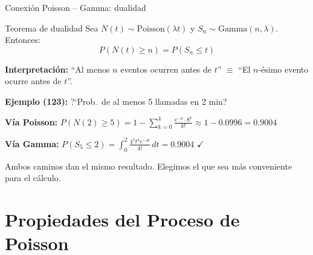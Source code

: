 \documentclass[aspectratio=1610, 9pt]{beamer}
\begin{document}
\begin{frame}{Conexi\'{o}n Poisson -- Gamma: dualidad}

\begin{block}{Teorema de dualidad}
Sea $N(t) \sim \text{Poisson}(\lambda t)$ y $S_n \sim \text{Gamma}(n,\lambda)$. Entonces:
\[
P(N(t) \geq n) = P(S_n \leq t)
\]
\end{block}

\textbf{Interpretaci\'{o}n:} ``Al menos $n$ eventos ocurren antes de $t$'' $\equiv$ ``El $n$-\'{e}simo evento ocurre antes de $t$''.

\vspace{0.3cm}
\textbf{Ejemplo (123):} ?`Prob.\ de al menos 5 llamadas en 2 min?

\vspace{0.1cm}
\textbf{V\'{i}a Poisson:} $P(N(2) \geq 5) = 1 - \sum_{k=0}^{4}\frac{e^{-8}\cdot 8^k}{k!} \approx 1 - 0.0996 = 0.9004$

\vspace{0.1cm}
\textbf{V\'{i}a Gamma:} $P(S_5 \leq 2) = \int_0^2 \frac{4^5 t^4 e^{-4t}}{4!}\,dt = 0.9004$ \quad $\checkmark$

\vspace{0.3cm}
Ambos caminos dan el mismo resultado. Elegimos el que sea m\'{a}s conveniente para el c\'{a}lculo.
\end{frame}

\section{Propiedades del Proceso de Poisson}
\end{document}
